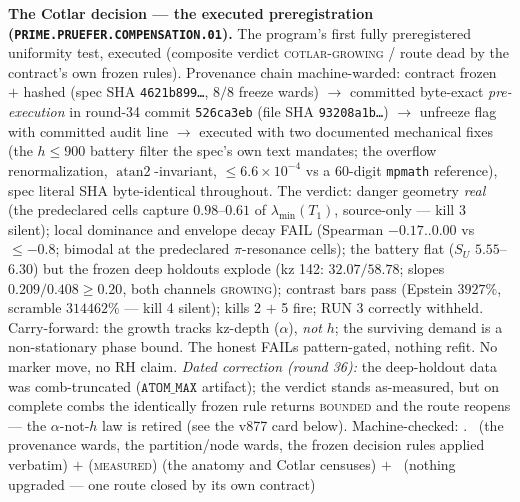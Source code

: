 \par\smallskip\noindent\textbf{The Cotlar decision --- the
executed preregistration
(\texttt{PRIME.PRUEFER.\allowbreak COMPENSATION.01}).}
The program's first fully preregistered uniformity test,
executed (composite verdict \textsc{cotlar-growing} / route
dead by the contract's own frozen rules).  Provenance chain
machine-warded: contract frozen $+$ hashed (spec SHA
\texttt{4621b899\ldots}, $8/8$ freeze wards) $\to$ committed
byte-exact \emph{pre-execution} in round-34 commit
\texttt{526ca3eb} (file SHA \texttt{93208a1b\ldots}) $\to$
unfreeze flag with committed audit line $\to$ executed with two
documented mechanical fixes (the $h \le 900$ battery filter the
spec's own text mandates; the overflow renormalization,
$\operatorname{atan2}$-invariant, $\le 6.6\times10^{-4}$ vs a
$60$-digit \texttt{mpmath} reference), spec literal SHA
byte-identical throughout.  The verdict: danger geometry
\emph{real} (the predeclared cells capture $0.98$--$0.61$ of
$\lambda_{\min}(T_1)$, source-only --- kill 3 silent); local
dominance and envelope decay FAIL (Spearman $-0.17..0.00$ vs
$\le -0.8$; bimodal at the predeclared $\pi$-resonance cells);
the battery flat ($S_U$ $5.55$--$6.30$) but the frozen deep
holdouts explode (kz 142: $32.07/58.78$; slopes $0.209/0.408
\ge 0.20$, both channels \textsc{growing}); contrast bars pass
(Epstein $3927\%$, scramble $314462\%$ --- kill 4 silent);
kills 2 $+$ 5 fire; RUN 3 correctly withheld.  Carry-forward:
the growth tracks kz-depth ($\alpha$), \emph{not} $h$; the
surviving demand is a non-stationary phase bound.  The honest
FAILs pattern-gated, nothing refit.  No marker move, no RH
claim.  \emph{Dated correction (round 36):} the deep-holdout
data was comb-truncated ($\texttt{ATOM\_MAX}$ artifact); the
verdict stands as-measured, but on complete combs the
identically frozen rule returns \textsc{bounded} and the route
reopens --- the $\alpha$-not-$h$ law is retired (see the v877
card below).
Machine-checked: .
\mE\ (the provenance wards, the partition/node wards, the
frozen decision rules applied verbatim) $+$
(\textsc{measured}) (the anatomy and Cotlar censuses) $+$
\mO\ (nothing upgraded --- one route closed by its own
contract)
\par\smallskip


